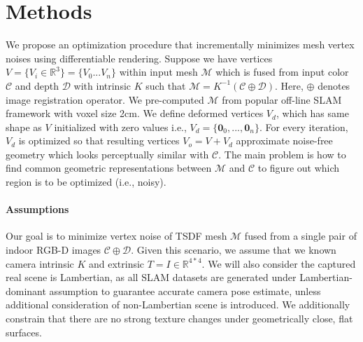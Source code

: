 \section{Methods}

We propose an optimization procedure that incrementally minimizes mesh vertex noises using differentiable rendering. 
Suppose we have vertices $V=\{V_i\in\mathbb{R}^3\}=\{V_0...V_n\}$ within input mesh $\mathcal{M}$ which is fused from input color $\mathcal{C}$ and depth $\mathcal{D}$ with intrinsic $K$ such that $\mathcal{M}=K^{-1}\left(\mathcal{C}\oplus \mathcal{D}\right)$. 
Here, $\oplus$ denotes image registration operator.
We pre-computed $\mathcal{M}$ from popular off-line SLAM framework \cite{zhou2018open3d} with voxel size 2cm.
We define deformed vertices $V_d$, which has same shape as $V$ initialized with zero values i.e., $V_d=\{\mathbf{0}_0,...,\mathbf{0}_n\}$. 
For every iteration, $V_d$ is optimized so that resulting vertices $V_o=V+V_d$ approximate noise-free geometry which looks perceptually similar with $\mathcal{C}$. 
The main problem is how to find common geometric representations between $\mathcal{M}$ and $\mathcal{C}$ to figure out which region is to be optimized (i.e., noisy).

\paragraph{Assumptions}
Our goal is to minimize vertex noise of TSDF mesh $\mathcal{M}$ fused from a single pair of indoor RGB-D images $\mathcal{C}\oplus \mathcal{D}$. Given this scenario, we assume that we known camera intrinsic $K$ and extrinsic $T=I\in\mathbb{R}^{4*4}$. 
We will also consider the captured real scene is Lambertian, as all SLAM datasets are generated under Lambertian-dominant assumption to guarantee accurate camera pose estimate, unless additional consideration of non-Lambertian scene is introduced. 
We additionally constrain that there are no strong texture changes under geometrically close, flat surfaces. 

